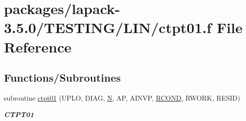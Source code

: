 \hypertarget{ctpt01_8f}{}\section{packages/lapack-\/3.5.0/\+T\+E\+S\+T\+I\+N\+G/\+L\+I\+N/ctpt01.f File Reference}
\label{ctpt01_8f}
\subsection*{Functions/\+Subroutines}
\begin{DoxyCompactItemize}
\item 
subroutine \hyperlink{group__complex__lin_ga5f7567587c2c990494aa239fdeeb407f}{ctpt01} (U\+P\+L\+O, D\+I\+A\+G, \hyperlink{polmisc_8c_a0240ac851181b84ac374872dc5434ee4}{N}, A\+P, A\+I\+N\+V\+P, \hyperlink{superlu__enum__consts_8h_af00a42ecad444bbda75cde1b64bd7e72a9b5c151728d8512307565994c89919d5}{R\+C\+O\+N\+D}, R\+W\+O\+R\+K, R\+E\+S\+I\+D)
\begin{DoxyCompactList}\small\item\em {\bfseries C\+T\+P\+T01} \end{DoxyCompactList}\end{DoxyCompactItemize}
